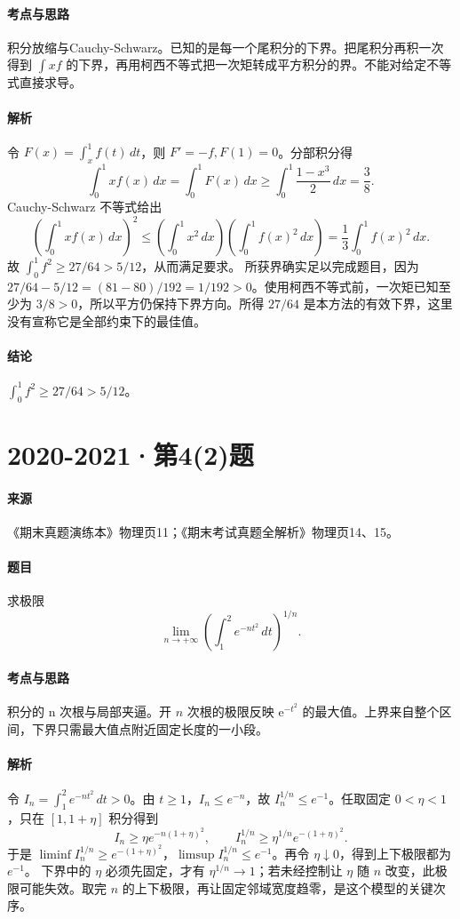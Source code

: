 \documentclass[UTF8,fontset=fandol,12pt,oneside,openany]{ctexrep}
\newcommand{\ee}{\mathrm e}
\theoremstyle{definition}
\begin{document}
\paragraph{考点与思路}
积分放缩与Cauchy-Schwarz。已知的是每一个尾积分的下界。把尾积分再积一次得到 $\int xf$ 的下界，再用柯西不等式把一次矩转成平方积分的界。不能对给定不等式直接求导。
\paragraph{解析}
令 $F(x)=\int_x^1f(t)\,dt$，则 $F'=-f,F(1)=0$。分部积分得
\[\int_0^1xf(x)\,dx=\int_0^1F(x)\,dx\ge\int_0^1\frac{1-x^3}2\,dx=\frac38.\]
Cauchy-Schwarz 不等式给出
\[\left(\int_0^1xf(x)\,dx\right)^2\le\left(\int_0^1x^2\,dx\right)\left(\int_0^1f(x)^2\,dx\right)=\frac13\int_0^1f(x)^2\,dx.\]
故 $\int_0^1f^2\ge27/64>5/12$，从而满足要求。
所获界确实足以完成题目，因为 $27/64-5/12=(81-80)/192=1/192>0$。使用柯西不等式前，一次矩已知至少为 $3/8>0$，所以平方仍保持下界方向。所得 $27/64$ 是本方法的有效下界，这里没有宣称它是全部约束下的最佳值。
\paragraph{结论}
$\int_0^1f^2\ge27/64>5/12$。

\par\addvspace{18pt}\noindent\begin{minipage}{\linewidth}
\section{2020-2021·第4(2)题}
\label{exam:11:q13}
\paragraph{来源} 《期末真题演练本》物理页11；《期末考试真题全解析》物理页14、15。
\paragraph{题目}
求极限 \[\lim_{n\to+\infty}\left(\int_1^2e^{-nt^2}\,dt\right)^{1/n}.\]
\end{minipage}\par
\paragraph{考点与思路}
积分的 n 次根与局部夹逼。开 $n$ 次根的极限反映 $\ee^{-t^2}$ 的最大值。上界来自整个区间，下界只需最大值点附近固定长度的一小段。
\paragraph{解析}
令 $I_n=\int_1^2e^{-nt^2}\,dt>0$。由 $t\ge1$，$I_n\le e^{-n}$，故 $I_n^{1/n}\le e^{-1}$。任取固定 $0<\eta<1$，只在 $[1,1+\eta]$ 积分得到 \[I_n\ge\eta e^{-n(1+\eta)^2},\qquad I_n^{1/n}\ge\eta^{1/n}e^{-(1+\eta)^2}.\]于是 $\liminf I_n^{1/n}\ge e^{-(1+\eta)^2}$，$\limsup I_n^{1/n}\le e^{-1}$。再令 $\eta\downarrow0$，得到上下极限都为 $e^{-1}$。
下界中的 $\eta$ 必须先固定，才有 $\eta^{1/n}\to1$；若未经控制让 $\eta$ 随 $n$ 改变，此极限可能失效。取完 $n$ 的上下极限，再让固定邻域宽度趋零，是这个模型的关键次序。
\end{document}
